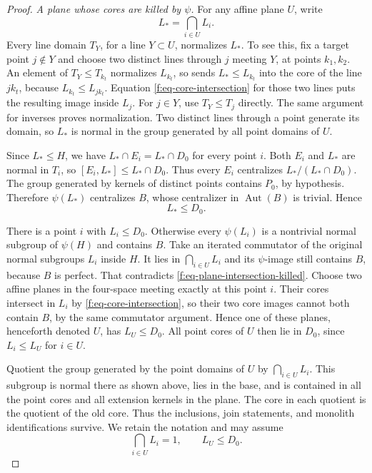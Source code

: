\begin{proof}
\emph{A plane whose cores are killed by $\psi$.}
For any affine plane $U$, write
\[
 L_* =\bigcap_{i\in U}L_i.
\]
Every line domain $T_Y$, for a line $Y\subset U$, normalizes $L_*$. To see
this, fix a target point $j\notin Y$ and choose two distinct lines through
$j$ meeting $Y$, at points $k_1,k_2$. An element of $T_Y\le T_{k_t}$
normalizes $L_{k_t}$, so sends $L_*\le L_{k_t}$ into the core of the line
$jk_t$, because $L_{k_t}\le L_{jk_t}$. Equation
\eqref{f:eq-core-intersection} for those two lines puts the resulting
image inside $L_j$. For $j\in Y$, use $T_Y\le T_j$ directly. The same
argument for inverses proves normalization. Two distinct lines through a
point generate its domain, so $L_*$ is normal in the group generated by
all point domains of $U$.

Since $L_*\le H$, we have $L_*\cap E_i=L_*\cap D_0$ for every point $i$.
Both $E_i$ and $L_*$ are normal in $T_i$, so
$[E_i,L_*]\le L_*\cap D_0$. Thus every $E_i$ centralizes
$L_* /(L_*\cap D_0)$. The group generated by kernels of distinct points
contains $P_0$, by hypothesis. Therefore $\psi(L_*)$ centralizes $B$,
whose centralizer in $\operatorname{Aut}(B)$ is trivial. Hence
\begin{equation}\label{f:eq-plane-intersection-killed}
 L_*\le D_0.
\end{equation}

There is a point $i$ with $L_i\le D_0$. Otherwise every $\psi(L_i)$ is a
nontrivial normal subgroup of $\psi(H)$ and contains $B$. Take an iterated
commutator of the original normal subgroups $L_i$ inside $H$. It lies in
$\bigcap_{i\in U}L_i$ and its $\psi$-image still contains $B$, because
$B$ is perfect.
That contradicts \eqref{f:eq-plane-intersection-killed}.
Choose two affine planes in the four-space meeting exactly at this point
$i$. Their cores intersect in $L_i$ by
\eqref{f:eq-core-intersection}, so their two core images cannot both
contain $B$, by the same commutator argument. Hence one of these planes,
henceforth denoted $U$, has $L_U\le D_0$. All point cores of $U$ then lie
in $D_0$, since $L_i\le L_U$ for $i\in U$.

Quotient the group generated by the point domains of $U$ by
$\bigcap_{i\in U}L_i$. This subgroup is normal there as shown above,
lies in the base, and is contained in all the point cores and all extension
kernels in the plane. The core in each quotient is the quotient of the
old core. Thus the inclusions, join statements, and monolith identifications
survive. We retain the notation and may assume
\begin{equation}\label{f:eq-zero-common-core}
 \bigcap_{i\in U}L_i=1,\qquad L_U\le D_0.
\end{equation}


\end{proof}
